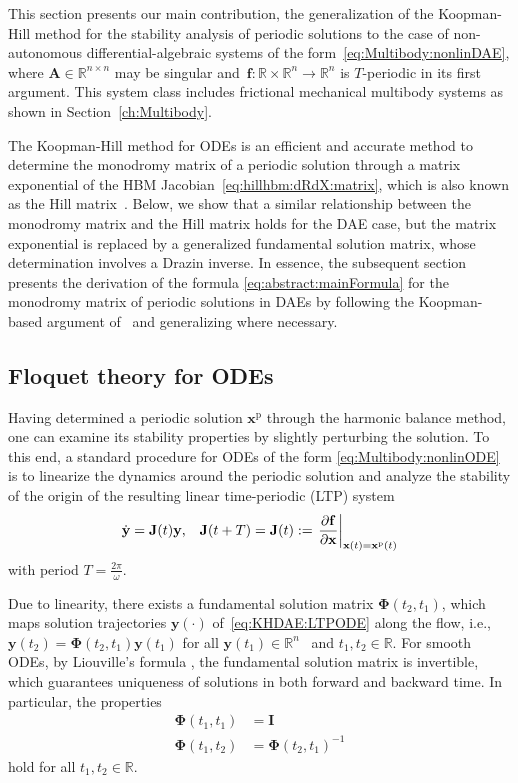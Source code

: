 \documentclass[a4paper, nonatbib, 3p, twocolumn]{elsarticle}
\theoremstyle{plain}
\theoremstyle{definition}
\theoremstyle{remark}
\newcommand{\pd}[2]{\frac{\partial #1}{\partial #2}}
\newcommand{\dy}{\dot{\vy}}
\newcommand{\Rspace}{\mathbb{R}}
\newcommand{\rp}{\mathrm p}
\newcommand{\vPh}{\mathbf \Phi}
\newcommand{\vf}{\mathbf f}
\newcommand{\vx}{\mathbf x}
\newcommand{\vy}{\mathbf y}
\newcommand{\vA}{\mathbf A}
\newcommand{\vI}{\mathbf I}
\newcommand{\vJ}{\mathbf J}
\begin{document}
This section presents our main contribution,
the generalization of the Koopman-Hill method for the stability analysis of periodic solutions to the case of non-autonomous differential-algebraic systems of the form~\eqref{eq:Multibody:nonlinDAE}, where $\vA \in \Rspace^{n\times n}$ may be singular and~$\vf:\Rspace\times\Rspace^n \rightarrow \Rspace^n$ is $T$-periodic in its first argument.
This system class includes frictional mechanical multibody systems as shown in Section~\ref{ch:Multibody}.

The Koopman-Hill method for ODEs is an efficient and accurate method to determine the monodromy matrix of a periodic solution through a matrix exponential of the HBM Jacobian~\eqref{eq:hillhbm:dRdX:matrix}, which is also known as the Hill matrix~\cite{Bayer2023,Bayer2024,Bayer2025}.
Below, we show that a similar relationship between the monodromy matrix and the Hill matrix holds for the DAE case, but the matrix exponential is replaced by a generalized fundamental solution matrix, whose determination involves a Drazin inverse.
In essence, the subsequent section presents the derivation of the formula \eqref{eq:abstract:mainFormula} for the monodromy matrix of periodic solutions in DAEs by following the Koopman-based argument of~\cite{Bayer2023} and generalizing where necessary.

\subsection{Floquet theory for ODEs}\label{sec:floquet}

Having determined a periodic solution $\vx^\rp$ through the harmonic balance method, one can examine its stability properties by slightly perturbing the solution.
To this end, a standard procedure for ODEs of the form \eqref{eq:Multibody:nonlinODE} is to linearize the dynamics around the periodic solution and analyze the stability of the origin of the resulting linear time-periodic (LTP) system
\begin{equation}\label{eq:KHDAE:LTPODE}
    \dy = \vJ(t)\vy\textnormal{,}\quad \vJ(t+T) = \vJ(t):= \left.\pd{\vf}{\vx}\right|_{\vx(t)=\vx^\rp(t)}
\end{equation}
 with period $T = \frac{2\pi}{\omega}$.

Due to linearity, there exists a fundamental solution matrix $\vPh(t_2, t_1)$, which maps solution trajectories $\vy(\cdot)$ of~\eqref{eq:KHDAE:LTPODE} along the flow, i.e., $\vy(t_2) = \vPh(t_2, t_1)\vy(t_1)$ for all $\vy(t_1) \in \Rspace^n$~\cite{Nayfeh1995} and $t_1, t_2 \in \Rspace$.
For smooth ODEs, by Liouville's formula \cite{Teschl2012}, the fundamental solution matrix is invertible, which guarantees uniqueness of solutions in both forward and backward time. In particular, the properties 
\begin{subequations}\label{eq:KHDAE:Phiproperties}
\begin{align}
    \vPh(t_1, t_1) &= \vI \\
    \vPh(t_1, t_2) &= \vPh(t_2, t_1)^{-1}
\end{align}
\end{subequations}
hold for all $t_1, t_2 \in \Rspace$.
\end{document}
